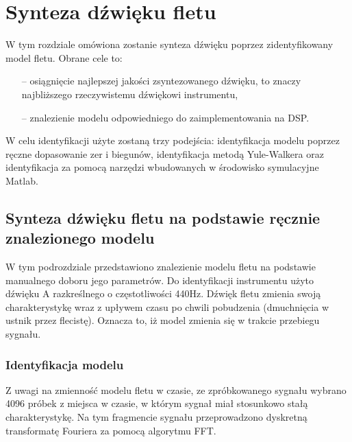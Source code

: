 \section{Synteza dźwięku fletu}

W tym rozdziale omówiona zostanie synteza dźwięku poprzez zidentyfikowany model fletu. Obrane cele to:
\begin{enumerate}
	\setlength\itemsep{-3pt}
	\item[--] osiągnięcie najlepszej jakości zsyntezowanego dźwięku, to znaczy najbliższego rzeczywistemu dźwiękowi instrumentu,
	\item[--] znalezienie modelu odpowiedniego do zaimplementowania na DSP.
\end{enumerate}


W celu identyfikacji użyte zostaną trzy podejścia: identyfikacja modelu poprzez ręczne dopasowanie zer i biegunów, identyfikacja metodą Yule-Walkera oraz identyfikacja za pomocą narzędzi wbudowanych w środowisko symulacyjne Matlab.

\subsection{Synteza dźwięku fletu na podstawie ręcznie znalezionego modelu}
W tym podrozdziale przedstawiono znalezienie modelu fletu na podstawie manualnego doboru jego parametrów. Do identyfikacji instrumentu użyto dźwięku A razkreślnego o częstotliwości 440Hz. Dźwięk fletu zmienia swoją charakterystykę wraz z upływem czasu po chwili pobudzenia (dmuchnięcia w ustnik przez flecistę). Oznacza to, iż model zmienia się w trakcie przebiegu sygnału.

\subsubsection{Identyfikacja modelu}
Z uwagi na zmienność modelu fletu w czasie, ze zpróbkowanego sygnału wybrano 4096 próbek z miejsca w czasie, w którym sygnał miał stosunkowo stałą charakterystykę. Na tym fragmencie sygnału przeprowadzono dyskretną transformatę Fouriera za pomocą algorytmu FFT.



